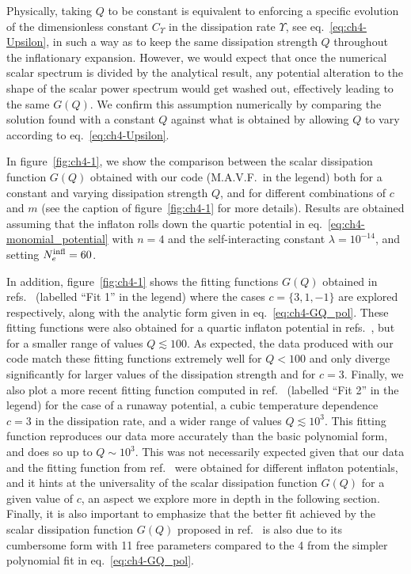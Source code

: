 Physically, taking $Q$ to be constant is equivalent to enforcing a specific evolution of the dimensionless constant $C_\Upsilon$ in the dissipation rate $\Upsilon$, see eq.~\eqref{eq:ch4-Upsilon}, in such a way as to keep the same dissipation strength $Q$ throughout the inflationary expansion. 
However, we would expect that once the numerical scalar spectrum is divided by the analytical result,
any potential alteration to the shape of the scalar power spectrum would get washed out, effectively leading to the same $G(Q)$. 
We confirm this assumption numerically by 
comparing
the solution found with a constant $Q$ against 
what is obtained by allowing $Q$ to vary according to eq.~\eqref{eq:ch4-Upsilon}. 

In figure~\ref{fig:ch4-1}, we show the comparison between the scalar dissipation function $G(Q)$ obtained with our code (M.A.V.F.\ in the legend) both for a constant and varying dissipation strength $Q$, and for different combinations of $c$ and $m$ (see the caption of figure~\ref{fig:ch4-1} for more details). 
Results are obtained assuming that the inflaton rolls down the quartic potential in eq.~\eqref{eq:ch4-monomial_potential} with $n=4$ and the self-interacting constant $\lambda=10^{-14}$, and setting $N_e^{\rm{infl}} = 60$. 


In addition, figure~\ref{fig:ch4-1} shows the fitting functions $G(Q)$ obtained in refs.~\cite{Bastero-Gil:2016qru,Benetti:2016jhf,Motaharfar:2018zyb} (labelled ``Fit 1'' in the legend) where the cases $c=\{3,1,-1\}$ are explored respectively, along with the analytic form given in eq.~\eqref{eq:ch4-GQ_pol}. These fitting functions were also obtained for a quartic inflaton potential in refs.~\cite{Bastero-Gil:2016qru,Benetti:2016jhf,Motaharfar:2018zyb}, but for a smaller range of values $Q \lesssim 100$. As expected, the data produced with our code match these fitting functions extremely well for $Q<100$ and only diverge significantly for larger values of the dissipation strength and for $c=3$. Finally, we also plot a more recent fitting function computed in ref.~\cite{Das:2020xmh} (labelled ``Fit 2'' in the legend) for the case of a runaway potential, a cubic temperature dependence $c=3$ in the dissipation rate, and a wider range of values $Q \lesssim 10^{3}$. This fitting function reproduces our data more accurately than the basic polynomial form, and does so up to  $Q \sim 10^{3}$. This was not necessarily expected given that our data and the fitting function from ref.~\cite{Das:2020xmh} were obtained for different inflaton potentials, and it hints at the universality of the scalar dissipation function $G(Q)$ for a given value of $c$, an aspect we explore more in depth in the following section. Finally, it is also important to emphasize that the better fit achieved by the scalar dissipation function $G(Q)$ proposed in ref.~\cite{Das:2020xmh} is also due to its cumbersome form with 11 free parameters compared to the 4 from the simpler polynomial fit in eq.~\eqref{eq:ch4-GQ_pol}.

